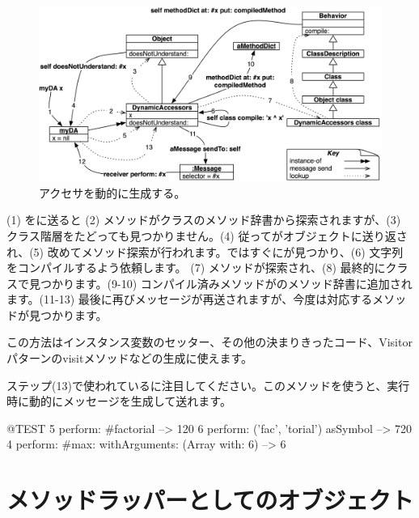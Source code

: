 \documentclass[a4paper,10pt,twoside]{book}
\begin{document}
\begin{figure}[ht]\centering
	\includegraphics[width=\linewidth]{DynamicAccessors}
	\caption{アクセサを動的に生成する。}
\end{figure}

(1) をに送ると (2) メソッドがクラスのメソッド辞書から探索されますが、(3) クラス階層をたどっても見つかりません。(4) 従ってがオブジェクトに送り返され、(5) 改めてメソッド探索が行われます。ではすぐにが見つかり、(6) 文字列をコンパイルするよう依頼します。 (7) メソッドが探索され、(8) 最終的にクラスで見つかります。(9-10) コンパイル済みメソッドがのメソッド辞書に追加されます。(11-13) 最後に再びメッセージが再送されますが、今度は対応するメソッドが見つかります。

この方法はインスタンス変数のセッター、その他の決まりきったコード、Visitorパターンのvisitメソッドなどの生成に使えます。

ステップ(13)で使われているに注目してください。このメソッドを使うと、実行時に動的にメッセージを生成して送れます。
\begin{code}{@TEST}
5 perform: #factorial                                             --> 120
6 perform: ('fac', 'torial') asSymbol                       --> 720
4 perform: #max: withArguments: (Array with: 6) --> 6
\end{code}

\section{メソッドラッパーとしてのオブジェクト}
\end{document}
